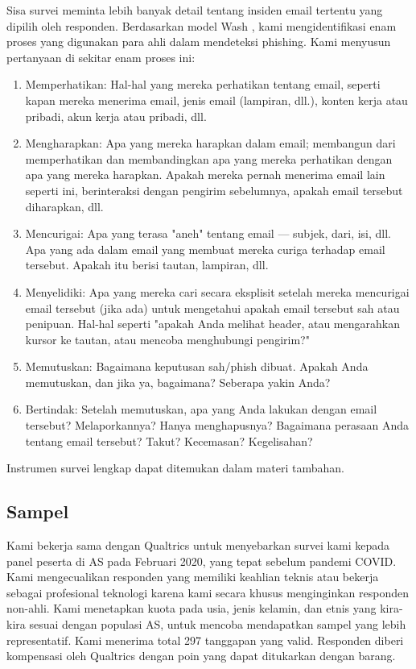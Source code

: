 \documentclass[lettersize,journal]{IEEEtran}
\begin{document}
Sisa survei meminta lebih banyak detail tentang insiden email tertentu yang
dipilih oleh responden. Berdasarkan model Wash \cite{tigaempat}, kami
mengidentifikasi enam proses yang digunakan para ahli dalam mendeteksi
phishing. Kami menyusun pertanyaan di sekitar enam proses ini:

\begin{enumerate}
  \item{Memperhatikan}: Hal-hal yang mereka perhatikan tentang email, seperti kapan mereka menerima email, jenis email (lampiran, dll.), konten kerja atau pribadi, akun kerja atau pribadi, dll.
  \item{Mengharapkan}: Apa yang mereka harapkan dalam email; membangun dari memperhatikan dan membandingkan apa yang mereka perhatikan dengan apa yang mereka harapkan. Apakah mereka pernah menerima email lain seperti ini, berinteraksi dengan pengirim sebelumnya, apakah email tersebut diharapkan, dll.
  \item{Mencurigai}: Apa yang terasa "aneh" tentang email — subjek, dari, isi, dll. Apa yang ada dalam email yang membuat mereka curiga terhadap email tersebut. Apakah itu berisi tautan, lampiran, dll.
  \item{Menyelidiki}: Apa yang mereka cari secara eksplisit setelah mereka mencurigai email tersebut (jika ada) untuk mengetahui apakah email tersebut sah atau penipuan. Hal-hal seperti "apakah Anda melihat header, atau mengarahkan kursor ke tautan, atau mencoba menghubungi pengirim?"
  \item{Memutuskan}: Bagaimana keputusan sah/phish dibuat. Apakah Anda memutuskan, dan jika ya, bagaimana? Seberapa yakin Anda?
  \item{Bertindak}: Setelah memutuskan, apa yang Anda lakukan dengan email tersebut? Melaporkannya? Hanya menghapusnya? Bagaimana perasaan Anda tentang email tersebut? Takut? Kecemasan? Kegelisahan?
\end{enumerate}

Instrumen survei lengkap dapat ditemukan dalam materi tambahan.

\subsection{Sampel}

Kami bekerja sama dengan Qualtrics untuk menyebarkan survei kami kepada panel
peserta di AS pada Februari 2020, yang tepat sebelum pandemi COVID. Kami
mengecualikan responden yang memiliki keahlian teknis atau bekerja sebagai
profesional teknologi karena kami secara khusus menginginkan responden
non-ahli. Kami menetapkan kuota pada usia, jenis kelamin, dan etnis yang
kira-kira sesuai dengan populasi AS, untuk mencoba mendapatkan sampel yang
lebih representatif. Kami menerima total 297 tanggapan yang valid. Responden
diberi kompensasi oleh Qualtrics dengan poin yang dapat ditukarkan dengan
barang.
\end{document}
